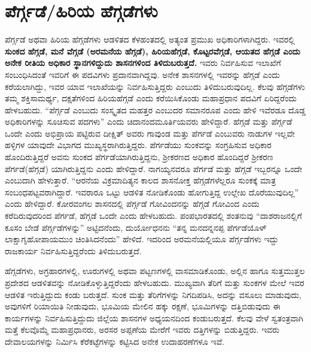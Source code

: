 \section{ಪೆರ್ಗ್ಗಡೆ/ಹಿರಿಯ ಹೆಗ್ಗಡೆಗಳು}

ಪೆರ್ಗ್ಗಡೆ ಅಥವಾ ಹಿರಿಯ ಹೆಗ್ಗಡೆಗಳು ಆಡಳಿತದ ಕೆಳಹಂತದಲ್ಲಿ ಅತ್ಯಂತ ಪ್ರಮುಖ ಅಧಿಕಾರಿಗಳಾಗಿದ್ದರು. ಇವರಲ್ಲಿ \textbf{ಸುಂಕದ ಹೆಗ್ಗಡೆ, ಮನೆ ವೆಗ್ಗಡೆ (ಅರಮನೆಯ ಹೆಗ್ಗಡೆ), ಹಿರಿಯಹೆಗ್ಗಡೆ, ಕೊಟ್ಟರವೆಗ್ಗಡೆ, ಆಯತದ ಹೆಗ್ಗಡೆ ಎಂದು ಅನೇಕ ರೀತಿಯ ಅಧಿಕಾರ ಸ್ಥಾನಗಳಿದ್ದುದು ಶಾಸನಗಳಿಂದ ತಿಳಿದುಬರುತ್ತದೆ. } ಇವರು ನಿರ್ವಹಿಸುವ ಇಲಾಖೆಗೆ ಸಂಬಂಧಿಸಿದಂತೆ ಇವರಿಗೆ ಈ ಪದವಿಗಳು ಪ್ರದಾನವಾಗಿದ್ದವು. ಅನೇಕ ಶಾಸನಗಳಲ್ಲಿ ಇವರನ್ನು ಹೆಗ್ಗಡೆ ಎಂದು ಕರೆಯಲಾಗಿದ್ದು, ಇವರ ಯಾವ ಇಲಾಖೆಯನ್ನು ನಿರ್ವಹಿಸುತ್ತಿದ್ದರು ಎಂಬುದು ತಿಳಿದುಬರುವುದಿಲ್ಲ. ಕೆಲವು ಹೆಗ್ಗಡೆಗಳು ತಮ್ಮ ಶಕ್ತಿಸಾಮರ್ಥ್ಯ, ದಕ್ಷತೆಗಳಿಂದ ಹಿರಿಯಹೆಗ್ಗಡೆ ಎಂದು ಕರೆಯಿಸಿಕೊಂಡು ಮಹಾಪ್ರಧಾನ ಪದವಿಗೆ ಏರಿದ್ದರೆಂದು ಹೇಳಬಹುದು. “ಪೆರ್ಗ್ಗಡೆ ಎಂಬುದು ಸಂಸ್ಕೃತದ ಮಹತ್ತರ ಎಂಬುದರ ಸಮಾನರೂಪ ಎಂದು ಹೇಳಿ ಇವೆರಡೂ ದೊಡ್ಡ ಅಧಿಕಾರಿಗಳನ್ನು ಸೂಚಿಸುವ ಪದಗಳು” ಎಂದು ಚಿದಾನಂದಮೂರ್ತಿಯವರು ಹೇಳಿದ್ದಾರೆ. ಹೆಗ್ಗಡೆ ಮತ್ತು ಪೆರ್ಗ್ಗಡೆ ಒಂದೇ ಎಂದು ಅಭಿಪ್ರಾಯ ಪಟ್ಟಿರುವ ದೀಕ್ಷಿತ್​ ಅವರು ಗಾವುಂಡ ಮತ್ತು ಪೆರ್ಗಡೆ ಎಂಬುವರು ನಾಡುಗಳ ಇಲ್ಲವೇ ಹಳ್ಳಿಗಳ ಯಾವುದೇ ವಿಭಾಗದ ಮುಖ್ಯಸ್ಥರಾಗಿರುತ್ತಿದ್ದರು. ಪೆರ್ಗಡೆಯು ಸುಂಕವನ್ನು ಸಂಗ್ರಹಿಸುವ ಅಧಿಕಾರ ಹೊಂದಿರುತ್ತಿದ್ದರೆ ಅವನು ಸುಂಕದ ಪೆರ್ಗಡೆಯಾಗಿರುತ್ತಿದ್ದನು, ಶ‍್ರೀಕರಣದ ಅಧಿಕಾರ ಹೊಂದಿದ್ದರೆ ಶ‍್ರೀಕರಣ ಪೆರ್ಗಡೆ(ಹೆಗ್ಗಡೆ) ಯಾಗಿರುತ್ತಿದ್ದನು ಎಂದು ಹೇಳಿದ್ದಾರೆ. ನಾಗಯ್ಯನವರೂ ಪೆರ್ಗಡೆ ಮತ್ತು ಹೆಗ್ಗಡೆ ಇಬ್ಬರನ್ನೂ ಒಂದೇ ಎಂಬುದಾಗಿ ಹೇಳುತ್ತಾರೆ. “ಆರನೆಯ ವಿಕ್ರಮಾದಿತ್ಯನ ಕಾಲದ ಶಾಸನೋಕ್ತ ಹೆಗ್ಗಡೆಗಳೆಲ್ಲರೂ ಸುಂಕಕ್ಕೆ ಮಾತ್ರ ಸಂಬಂಧಪಟ್ಟವರಾಗಿದ್ದಾರೆ. ಇವರಾರೂ ಒಟ್ಟು ಆಡಳಿತ ನೋಡಿಕೊಂಡು ಹೋಗುತ್ತಿದ್ದ ಉಲ್ಲೇಖ ದೊರೆಯುವುದಿಲ್ಲ” ಎಂದು ಹೇಳಿದ್ದಾರೆ. ಕೋರವಂಗಲ ಶಾಸನದಲ್ಲಿ ಪೆರ್ಗ್ಗಡೆ ಗೋವಿಂದನನ್ನು ಹೆಗ್ಗಡೆ ಗೋವಿಂದ ಎಂದು ಕರೆದಿರುವುದರಿಂದ ಪೆರ್ಗಡೆ, ಹೆಗ್ಗಡೆ ಒಂದೇ ಎಂದು ಹೇಳಬಹುದು. ಪಂಪಭಾರತದಲ್ಲಿ ಶಂತನುವು “ದಾಶರಾಜನಲ್ಲಿಗೆ ಕೂಸಂ ಬೇಡೆ ಪೆರ್ಗ್ಗಡೆಗಳನ್ನು” ಅಟ್ಟಿದನೆಂದು, ದುರ್ಯೋಧನನು “ತನ್ನ ಮನದನ್ನನಪ್ಪ ಪೆರ್ಗಡೆಯೊಳ್​ ಲಾಕ್ಷಾಗೃಹೋಪಾಯಮುಂ ಚಿಂತಿಸಿದನೆಂದು” ಹೇಳಿದೆ. ಇದರಿಂದ ಅರಮನೆಯಲ್ಲಿಯೂ ಪೆರ್ಗ್ಗಡೆಗಳು ಇದ್ದು ರಾಜಕಾರ್ಯ ನಿರ್ವಹಿಸುತ್ತಿದ್ದರೆಂದು ತಿಳಿದುಬರುತ್ತದೆ.

ಹೆಗ್ಗಡೆಗಳು, ಅಗ್ರಹಾರಗಳಲ್ಲಿ, ಊರುಗಳಲ್ಲಿ ಅಥವಾ ಪಟ್ಟಣಗಳಲ್ಲಿ ವಾಸಮಾಡಿಕೊಂಡು, ಅಲ್ಲಿನ ಹಾಗೂ ಸುತ್ತಮುತ್ತಲ ಪ್ರದೇಶದ ಆಡಳಿತವನ್ನು ನೋಡಿಕೊಳ್ಳುತ್ತಿದ್ದರೆಂದು ಹೇಳಬಹುದು. ಮುಖ್ಯವಾಗಿ ತೆರಿಗೆ ಮತ್ತು ಸುಂಕಗಳ ಮೇಲೆ ಇವರ ಆಡಳಿತ ಇರುತ್ತಿದ್ದುದು ಕಂಡು ಬರುತ್ತದೆ. ಸುಂಕ ಮತ್ತು ತೆರಿಗೆಗಳನ್ನು ನಿಗದಿಪಡಿಸಿ, ಅದನ್ನು ವಸೂಲು ಮಾಡುವುದು, ಅವುಗಳಿಗೆ ರಿಯಾಯಿತಿ ನೀಡುವುದು, ಭೂಮಿಯ ಮೇಲಿನ ಹಕ್ಕು ರಕ್ಷಣೆ, ಭೂಮಿಗಳನ್ನು ದತ್ತಿಬಿಡುವುದು ಈ ಕಾರ್ಯಗಳನ್ನು ನಿರ್ವಹಿಸುತ್ತಿದ್ದುದು ಜಿಲ್ಲೆಯ ಶಾಸನಗಳ ಅಧ್ಯಯನದಿಂದ ಕಂಡುಬರುತ್ತದೆ. ಕೆಲವು ವೇಳೆ ಸ್ವತಂತ್ರವಾಗಿ ಮತ್ತೆ ಕೆಲವೊಮ್ಮೆ ಮಹಾಪ್ರಧಾನರು, ಅರಸರ ಅಪ್ಪಣೆಯ ಮೇರೆಗೆ ಇವರು ದತ್ತಿಗಳನ್ನು ಬಿಡುತ್ತಿದ್ದರು. ಇವರು ದೇವಾಲಯಗಳನ್ನು ನಿರ್ಮಿಸಿ ಕೆರೆಕಟ್ಟೆಗಳನ್ನು ಕಟ್ಟಿಸಿದ ಅನೇಕ ಉದಾಹರಣೆಗಳೂ ಇವೆ.

